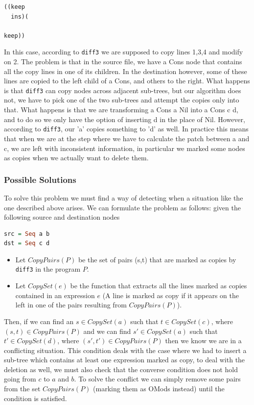 \documentclass[11pt]{article}
\begin{document}
\begin{lstlisting}[language=haskell]
((keep
  ins)(

keep))
\end{lstlisting}

In this case, according to \texttt{diff3} we are supposed to copy lines 1,3,4 
and modify on 2. The problem is that in the source file, we have a Cons node 
that contains all the copy lines in one of its children. In the destination 
however, some of these lines are copied to the left child of a Cons, and others 
to the right. What happens is that \texttt{diff3} can copy nodes across adjacent sub-trees, 
but our algorithm does not, we have to pick one of the two sub-trees and attempt 
the copies only into that.
What happens is that we are transforming a Cons a Nil into a Cons c d, and to do 
so we only have the option of inserting d in the place of Nil. However, 
according to \texttt{diff3}, our 'a' copies something to 'd' as well. In practice 
this means that when we are at the step where we have to calculate the patch between 
a and c, we are left with inconsistent information, in particular we marked some nodes as copies when we
actually want to delete them.

\subsubsection{Possible Solutions}

To solve this problem we must find a way of detecting when a situation like the 
one described above arises. We can formulate the problem as follows:
given the following source and destination nodes

\begin{lstlisting}[language=haskell]
src = Seq a b
dst = Seq c d
\end{lstlisting}

\begin{itemize}
  \item Let $CopyPairs(P)$ be the set of pairs (s,t) that are marked as copies by 
\texttt{diff3} in the program $P$.

\item Let $CopySet(e)$ be the function that extracts all the lines marked as copies 
contained in an expression $e$ (A line is marked as copy if it appears on the left in one of the pairs resulting from $CopyPairs(P)$).
\end{itemize}

Then, if we can find an $s \in CopySet(a)$ such that $t \in CopySet(c)$, where $(s,t) \in 
CopyPairs(P)$ and we can find $s' \in CopySet(a)$ such that $t' \in CopySet(d)$, where $(s',t') \in 
CopyPairs(P)$ then we know we are in a conflicting situation. 
This condition deals with the case where we had to insert a sub-tree which 
contains at least one expression marked as copy, to deal with the deletion as well, we 
must also check that the converse condition does not hold going from $c$ to $a$ 
and $b$.
To solve the conflict we can simply remove some pairs from the set $CopyPairs(P)$ (marking them as OMods instead)
until the condition is satisfied. 
\\\\
\end{document}
